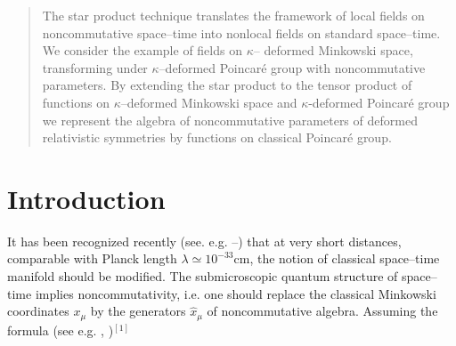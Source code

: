 \documentclass[a4paper,12pt]{article}
\begin{document}
\date{}                                                                                 
\maketitle                                                                              
                                                                                        
\begin{abstract}
The star product technique  translates the framework of local
fields on noncommutative  space--time into nonlocal fields on 
standard
 space--time. We consider the example of fields on $\kappa$--
deformed Minkowski
 space, transforming under $\kappa$--deformed Poincar\'{e} group 
with
 noncommutative parameters. By extending the star product to the
 tensor product of functions on $\kappa$--deformed
 Minkowski space and $\kappa$-deformed
 Poincar\'{e}  group we represent the algebra of noncommutative 
parameters of
 deformed relativistic symmetries
 by functions on classical Poincar\'{e} group.
\end{abstract}




\section{Introduction}
\label{lucsec1}

It has been recognized recently (see. e.g.
\cite{rluk1}--\cite{rluk3})
  that at very short distances, comparable with Planck length
 $\lambda \simeq 10^{-33}$cm, the notion of classical space--time 
manifold should
 be modified. The submicroscopic quantum structure of space--
time implies
 noncommutativity, i.e. one should replace   the classical  
Minkowski coordinates
 $x_{\mu}$ by the generators $\widehat{x}_{\mu}$ of 
noncommutative algebra.
 Assuming the formula (see e.g.
   \cite{rluk4}, \cite{rluk5})$^{[1]}$
\end{document}

